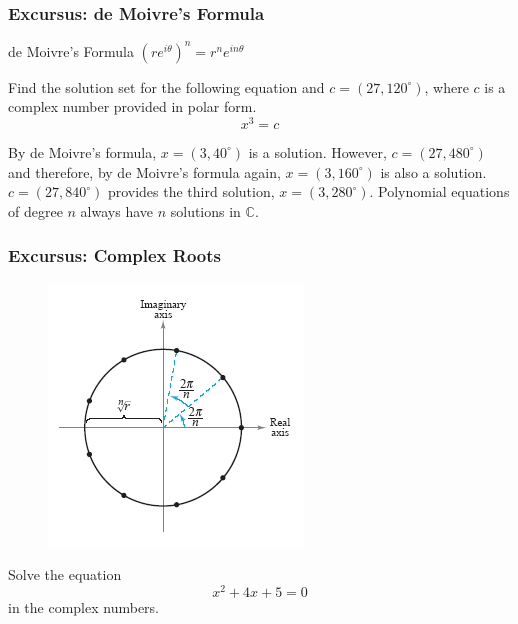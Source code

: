 \documentclass[xcolor=dvipsnames]{beamer}
\begin{document}
\begin{frame}
  \frametitle{Excursus: de Moivre's Formula}
\begin{block}{de Moivre's Formula}
  $\left(re^{i\theta}\right)^{n}=r^{n}e^{in\theta}$
\end{block}

\medskip

 Find the solution set for the following equation
and $c=(27,120^{\circ})$, where $c$ is a complex number provided in
polar form.
\begin{equation}
  \label{eq:aephacha}
  x^{3}=c
\end{equation}

\medskip

By de Moivre's formula, $x=(3,40^{\circ})$ is a solution. However,
$c=(27,480^{\circ})$ and therefore, by de Moivre's formula again,
$x=(3,160^{\circ})$ is also a solution. $c=(27,840^{\circ})$ provides
the third solution, $x=(3,280^{\circ})$. Polynomial equations of
degree $n$ always have $n$ solutions in $\mathbb{C}$. 
\end{frame}

\begin{frame}
  \frametitle{Excursus: Complex Roots}
    \begin{figure}[h]
    \includegraphics[scale=0.5]{./diagrams/comproot.png}
  \end{figure}
  {\ubung} Solve the equation
  \begin{equation}
    \label{eq:phoojahs}
    x^{2}+4x+5=0
  \end{equation}
  in the complex numbers.
\end{frame}
\end{document}
